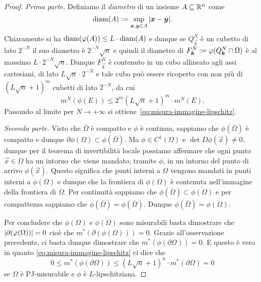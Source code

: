 \begin{proof}
\emph{Prima parte.}
Definiamo il \emph{diametro} di un insieme $A\subseteq {\mathbb R}^n$ come
\[
  \operatorname{diam}(A) := \sup_{\boldsymbol x,\boldsymbol y\in A} {\left|\boldsymbol x - \boldsymbol y\right|}.
\]
Chiaramente si ha $\operatorname{diam}(\varphi(A)) \le L \cdot \operatorname{diam}(A)$
e dunque se $Q^N_{\vec k}$ è un cubetto di lato $2^{-N}$
il suo diametro è $2^{-N}\sqrt n$ e quindi 
il diametro di $F^N_{\boldsymbol k} := \varphi(Q^N_{\boldsymbol k}\cap \Omega)$ 
è al massimo $L \cdot 2^{-N}\sqrt n$. 
Dunque $F^N_{\vec k}$ 
è contenuto in un cubo allineato agli assi cartesiani, di lato 
$L\sqrt n \cdot 2^{-N}$ e tale cubo può essere ricoperto 
con non più di $(L\sqrt n + 1)^m$ cubetti 
di lato $2^{-N}$, da cui
\[
 m^N(\phi(E)) \le 2^m (L\sqrt n + 1)^m \cdot m^N(E).
\]
Passando al limite per $N\to +\infty$ si ottiene~\eqref{eq:misura-immagine-lipschitz}.

\emph{Seconda parte.}
Visto che $\bar \Omega$ è compatto e $\phi$ è continua, 
sappiamo che $\phi(\bar \Omega)$ è compatto e dunque 
$\partial \phi(\Omega)\subset \phi(\bar \Omega)$.
Ma $\phi\in C^1(\Omega)$ e $\det D\phi(\vec x)\neq 0$,
dunque per il teorema di invertibilità locale
possiamo affermare che ogni punto $\vec x\in \Omega$ ha un intorno
che viene mandato, tramite $\phi$, in un intorno del punto di arrivo 
$\phi(\vec x)$.
Questo significa che punti interni a $\Omega$ vengono mandati 
in punti interni a $\phi(\Omega)$
e dunque che la frontiera di $\phi(\Omega)$ è contenuta nell'immagine 
della frontiera di $\Omega$.
Per continuità sappiamo che $\phi(\bar \Omega) \subset \overline{\phi(\Omega)}$ 
e per compattezza sappiamo che $\overline {\phi(\bar \Omega)} = \phi(\bar \Omega)$.
Dunque $\phi(\bar \Omega) = \overline{\phi(\Omega)}$. 

Per concludere che $\phi(\Omega)$ e $\overline{\phi(\Omega)}$ sono misurabili basta dimostrare che 
${\left|\partial (\varphi(\Omega))\right|}=0$ cioè che $m^*(\partial (\phi(\Omega)))= 0$.
Grazie all'osservazione precedente, ci basta dunque dimostrare
che $m^*(\phi(\partial \Omega)) = 0$.
E questo è vero in quanto \eqref{eq:misura-immagine-lipschitz}
ci dice che
\[
 0 \le m^*(\phi(\partial \Omega)) 
 \le (L\sqrt n+1)^n \cdot m^*(\partial \Omega) = 0
\]
se $\Omega$ è PJ-misurabile e $\phi$ è $L$-lipschitziana.
\end{proof}


